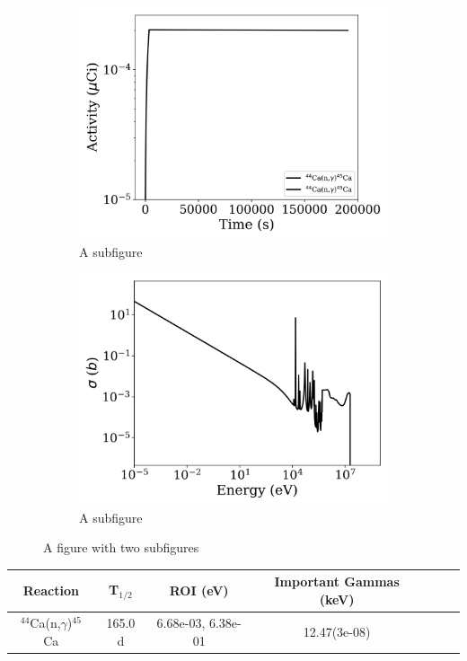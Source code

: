 \begin{figure}[h]
\centering
\begin{subfigure}{.5\textwidth}
  \centering
     \includegraphics[width=.8\textwidth]{plot/Ca-44(n,gamma)Ca-45_library1} 

  \caption{A subfigure}
  \label{fig:sub1}
\end{subfigure}%
\begin{subfigure}{.5\textwidth}
  \centering
     \includegraphics[width=.8\textwidth]{plot/Ca-44(n,gamma)Ca-45} 

  \caption{A subfigure}
  \label{fig:sub2}
\end{subfigure}
\caption{A figure with two subfigures}
\label{fig:test}
\end{figure}

\begin{table}[h]
\centering
\begin{tabular}{ |c|c|c|c|c|c|c| }
 \hline
 Reaction & T$_{1/2}$ & ROI (eV) & Important Gammas (keV) \\
 \hline 
 $^{44}$Ca(n,$\gamma$)$^{45}$Ca & 165.0 d & 6.68e-03, 6.38e-01 & 12.47(3e-08) \\ 
\hline
\end{tabular}
\end{table}

